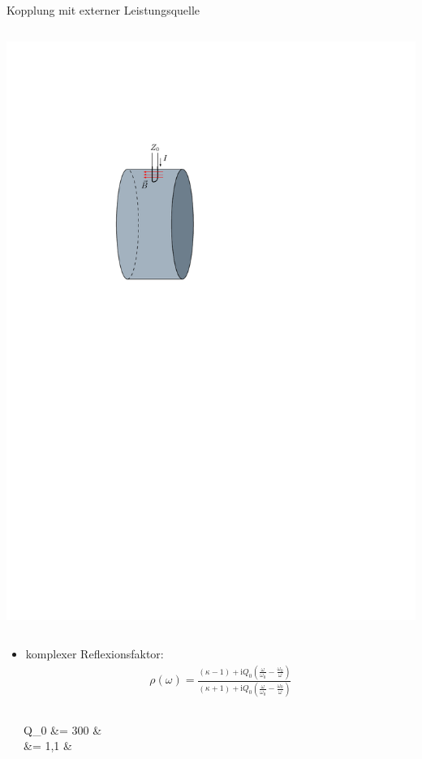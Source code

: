 \documentclass[12pt,xcolor=dvipsnames,professionalfonts]{beamer}
\begin{document}
\begin{frame}{Kopplung mit externer Leistungsquelle}
\begin{columns}[c]
		\centering
		\includegraphics[scale=0.8]{./figures/pillbox_loop.pdf}
	\end{columns}
	
\end{frame}

\begin{frame}
	\begin{itemize}
		\item komplexer Reflexionsfaktor:
		\begin{align*}
		\rho(\omega) = \frac{(\kappa - 1) + \mathrm{i} Q_0 \left(\frac{\omega}{\omega_0} - \frac{\omega_0}{\omega}\right) }{(\kappa + 1) + \mathrm{i} Q_0 \left( \frac{\omega}{\omega_0} - \frac{\omega_0}{\omega} \right)}
		\end{align*}
	\end{itemize}
	\vfill
	\begin{columns}[c]
			\begin{small}
				\centering
				
			\end{small}		
		\vspace*{-1.3cm}
		\begin{flalign*}
			Q_0 &= 300 &\\
			\kappa &= 1{,}1 &
		\end{flalign*}
	\end{columns}
\end{frame}
	
\end{document}
